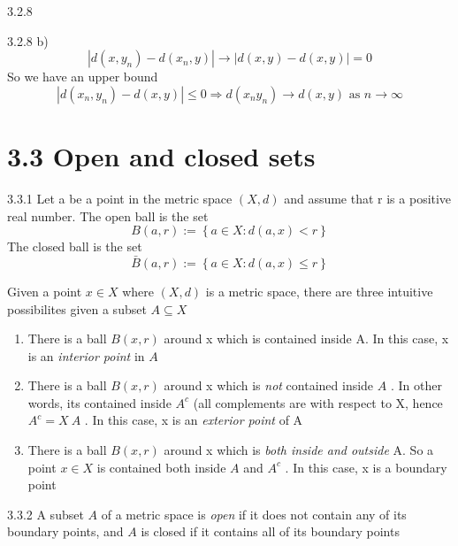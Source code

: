 \documentclass[a4paper,norsk]{article}
\renewcommand{\leq}{\leqslant}
\begin{document}
\begin{oppgavebox}{3.2.8}{}
\begin{itemize}
\begin{proofbox}{3.2.8 b)}{}
    \[
        \left| d(x, y_n) - d(x_n, y) \right| \rightarrow \left| d(x,y) - d(x,y) \right| = 0
    \]
    So we have an upper bound 
    \[
        \left| d(x_n, y_n) - d(x,y) \right| \leq 0 \Rightarrow d(x_n y_n) \rightarrow d(x,y) \text{ as } n \rightarrow \infty 
    \]
    
    
    
  \end{proofbox}
\end{itemize}
\end{oppgavebox}


\section*{3.3 Open and closed sets}

\begin{definitionbox}{3.3.1}{}
Let a be a point in the metric space $ \left( X, d \right)  $ and assume that r is a positive real number. The open ball is the set
\[
    B \left( a, r \right) := \left\{ a \in X : d(a, x) < r \right\} 
\]
The closed ball is the set
\[
    \bar{B} \left( a, r \right) := \left\{ a \in X : d(a, x) \leq r \right\}  
\]
\end{definitionbox}

Given a point $ x \in X $ where $ \left( X, d \right)  $ is a metric space, there are three intuitive possibilites given a subset $ A \subseteq X $ 
\begin{enumerate}
  \item There is a ball $ B \left( x, r \right)  $ around x which is contained inside A. In this case, x is an \textit{interior point} in $ A $ 
  \item There is a ball $ B \left( x, r \right)  $ around x which is \textit{not} contained inside $ A $ . In other words, its contained inside $ A^c $ (all complements are with respect to X, hence $ A^c = X \ A $  . In this case, x is an \textit{exterior point} of A
  \item There is a ball $ B \left( x, r \right)  $ around x which is \textit{both inside and outside} A. So a point $ x \in X $ is contained both inside $ A $ and $ A^c $   . In this case, x is a boundary point
\end{enumerate}

\begin{definitionbox}{3.3.2}{}
A subset $ A $ of a metric space is \textit{open} if it does not contain any of its boundary points, and $ A $ is closed if it contains all of its boundary points
\end{definitionbox}
\end{document}
